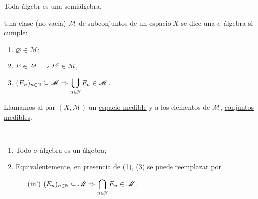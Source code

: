 	\begin{note}
		Toda álgebr es una semiálgebra.
	\end{note}

	\begin{definition}
		Una clase (no vacía) $\mathscr{M}$ de subconjuntos de un espacio $X$ se dice una $\sigma$-álgebra si cumple:
		\begin{enumerate}
			\item $\varnothing \in \mathscr{M}$;

			\item $E \in \mathscr{M} \implies E^c \in \mathscr{M}$;

			\item $(E_n)_{n\in\mathbb{N}} \subseteq \mathscr{M} \Rightarrow \displaystyle\bigcup_{n\in\mathbb{N}} E_n \in \mathscr{M}$.
		\end{enumerate}
		\noindent Llamamos al par $(X,\mathscr{M})$ un \underline{espacio medible} y a los elementos de $\mathscr{M}$, \underline{conjuntos medibles}.
	\end{definition}

	\begin{note}~
		\begin{enumerate}
			\item Todo $\sigma$-álgebra es un álgebra;

			\item Equivalentemente, en presencia de (1), (3) se puede reemplazar por
			\begin{enumerate}
				\item[(iii')] $(E_n)_{n\in\mathbb{N}} \subseteq \mathscr{M} \Rightarrow \displaystyle\bigcap_{n\in\mathbb{N}} E_n \in \mathscr{M}$.
			\end{enumerate}
		\end{enumerate}
	\end{note}


